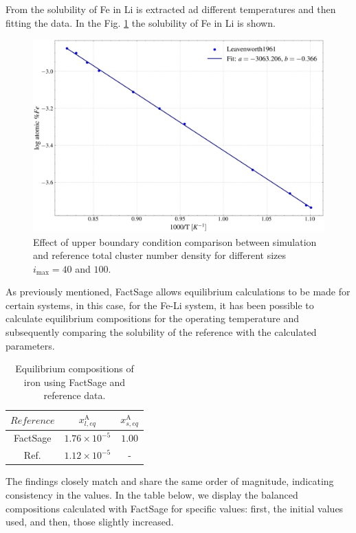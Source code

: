 From \cite{Leavenworth1961TheSO} the solubility of Fe in Li is extracted ad different temperatures and then fitting the data. In the Fig. \ref{fig:Fe_solubility} the solubility of Fe in Li is shown.
\begin{figure}[H]
    \centering
    \includegraphics[width=0.9\linewidth]{Fe_solubility.png}
    \caption{Effect of upper boundary condition comparison between simulation and reference total cluster number density for different sizes $i_{\text{max}} = 40$ and $100$.}
    \label{fig:Fe_solubility}
\end{figure}

As previously mentioned, FactSage allows equilibrium calculations to be made for certain systems, in this case, for the Fe-Li system, it has been 
possible to calculate equilibrium compositions for the operating temperature and subsequently 
comparing the solubility of the reference with the calculated parameters.

\begin{table}[ht]
	\centering
	\label{tab:your_label_here}
	\begin{tabular}{ccc}
	\hline
	$Reference$ & $x^{\text{A}}_{l,eq}$ & $x^{\text{A}}_{s,eq}$ \\ \hline
	FactSage \cite{Bale2016} & $1.76 \times 10^{-5} $        & $1.00$         \\
	Ref. \cite{Leavenworth1961TheSO}       & $1.12 \times 10^{-5}$         & -         \\
	\end{tabular}
	\caption{Equilibrium compositions of iron using FactSage and reference data.}
\end{table}

The findings closely match and share the same order of magnitude, indicating consistency in the values. In the table below, we 
display the balanced compositions calculated with FactSage for specific values: first, the initial values used, and then, those slightly increased.

